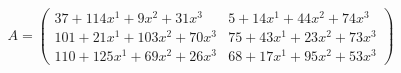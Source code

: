 \documentclass[preview]{standalone}
\begin{document}
\begin{align*}
A = \begin{pmatrix}37 + 114x^{1} + 9x^{2} + 31x^{3} & 5 + 14x^{1} + 44x^{2} + 74x^{3} \\ 101 + 21x^{1} + 103x^{2} + 70x^{3} & 75 + 43x^{1} + 23x^{2} + 73x^{3} \\ 110 + 125x^{1} + 69x^{2} + 26x^{3} & 68 + 17x^{1} + 95x^{2} + 53x^{3}\end{pmatrix}
\end{align*}
\end{document}
